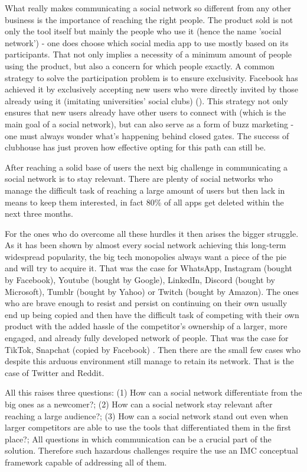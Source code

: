 \documentclass[12pt]{article}
\begin{document}
What really makes communicating a social network so different from any other business is the importance of reaching the right people. The product sold is not only the tool itself but mainly the people who use it (hence the name 'social network') - one does choose which social media app to use mostly based on its participants. That not only implies a necessity of a minimum amount of people using the product, but also a concern for which people exactly. A common strategy to solve the participation problem is to ensure exclusivity. Facebook has achieved it by exclusively accepting new users who were directly invited by those already using it (imitating universities' social clubs) (\cite{zucked}). This strategy not only ensures that new users already have other users to connect with (which is the main goal of a social network), but can also serve as a form of buzz marketing - one must always wonder what's happening behind closed gates. The success of clubhouse has just proven how effective opting for this path can still be.
 
After reaching a solid base of users the next big challenge in communicating a social network is to stay relevant.  There are plenty of social networks who manage the difficult task of reaching a large amount of users but then lack in means to keep them interested, in fact 80\% of all apps get deleted within the next three months.

For the ones who do overcome all these hurdles it then arises the bigger struggle. As it has been shown by almost every social network achieving this long-term widespread popularity, the big tech monopolies always want a piece of the pie and will try to acquire it. That was the case for WhatsApp, Instagram (bought by Facebook), Youtube (bought by Google), LinkedIn, Discord (bought by Microsoft), Tumblr (bought by Yahoo) or Twitch (bought by Amazon). The ones who are brave enough to resist and persist on continuing on their own usually end up being copied and then have the difficult task of competing with their own product with the added hassle of the competitor's ownership of a larger, more engaged, and already fully developed network of people. That was the case for TikTok, Snapchat (copied by Facebook) . Then there are the small few cases who despite this arduous environment still manage to retain its network. That is the case of Twitter and Reddit.

All this raises three questions: (1) How can a social network differentiate from the big ones as a newcomer?; (2) How can a social network stay relevant after reaching a large audience?; (3) How can a social network stand out even when larger competitors are able to use the tools that differentiated them in the first place?; All questions in which communication can be a crucial part of the solution. Therefore such hazardous challenges require the use an IMC conceptual framework capable of addressing all of them.
\end{document}
